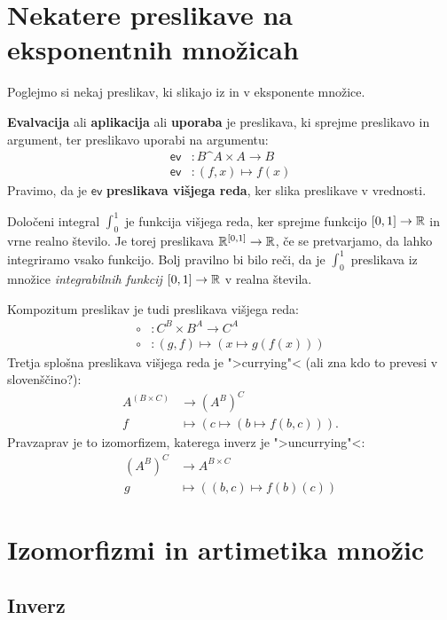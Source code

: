 \section{Nekatere preslikave na eksponentnih množicah}

Poglejmo si nekaj preslikav, ki slikajo iz in v eksponente množice.

\textbf{Evalvacija} ali \textbf{aplikacija} ali \textbf{uporaba} je preslikava, ki sprejme preslikavo in argument, ter preslikavo uporabi na argumentu:
%
\begin{align*}
  \mathsf{ev} &: B\^A \times A \to B \\
  \mathsf{ev} &: (f, x) \mapsto f(x)
\end{align*}
%
Pravimo, da je $\mathsf{ev}$ \textbf{preslikava višjega reda}, ker slika preslikave v vrednosti.

\begin{primer}
  Določeni integral $\int_0^1$ je funkcija višjega reda, ker
  sprejme funkcijo $[0,1] \to \mathbb{R}$ in vrne realno število. Je torej preslikava
  $\mathbb{R}^{[0,1]} \to \mathbb{R}$, če se pretvarjamo, da lahko integriramo vsako funkcijo.
  Bolj pravilno bi bilo reči, da je $\int_0^1$ preslikava iz množice \emph{integrabilnih funkcij $[0,1] \to \mathbb{R}$} v realna števila.
\end{primer}

Kompozitum preslikav je tudi preslikava višjega reda:
%
\begin{align*}
    {\circ} &: C^B \times B^A \to C^A \\
    {\circ} &: (g, f) \mapsto (x \mapsto g(f(x)))
\end{align*}
%
Tretja splošna preslikava višjega reda je ">currying"< (ali zna kdo to prevesi v slovenščino?):
%
\begin{align*}
  A^(B \times C) &\to (A^B)^C \\
  f &\mapsto (c \mapsto (b \mapsto f(b, c))).
\end{align*}
%
Pravzaprav je to izomorfizem, katerega inverz je ">uncurrying"<:
%
\begin{align*}
  (A^B)^C &\to A^{B \times C} \\
  g       &\mapsto ((b, c) \mapsto f(b)(c))
\end{align*}


\section{Izomorfizmi in artimetika množic}

\subsection{Inverz}

